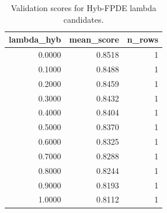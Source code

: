 \begin{table}[t]
\caption{Validation scores for Hyb-FPDE lambda candidates.}
\label{tab:lambda_distribution_computed}
\centering
\begin{tabular}{rrr}
\toprule
lambda\_hyb & mean\_score & n\_rows \\
\midrule
0.0000 & 0.8518 & 1 \\
0.1000 & 0.8488 & 1 \\
0.2000 & 0.8459 & 1 \\
0.3000 & 0.8432 & 1 \\
0.4000 & 0.8404 & 1 \\
0.5000 & 0.8370 & 1 \\
0.6000 & 0.8325 & 1 \\
0.7000 & 0.8288 & 1 \\
0.8000 & 0.8244 & 1 \\
0.9000 & 0.8193 & 1 \\
1.0000 & 0.8112 & 1 \\
\bottomrule
\end{tabular}

\end{table}
